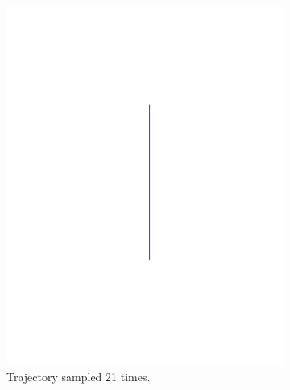\begin{figure}
  \begin{subfigure}[b]{0.5\textwidth}
    \includegraphics[trim={5cm 5cm 5cm 5cm},
    width=.95\textwidth]{figures/method/trajectory-sampled}
    \caption{Trajectory sampled 21 times.\newline}
  \end{subfigure}%
  \begin{subfigure}[b]{0.5\textwidth}

\end{subfigure}
\end{figure}
